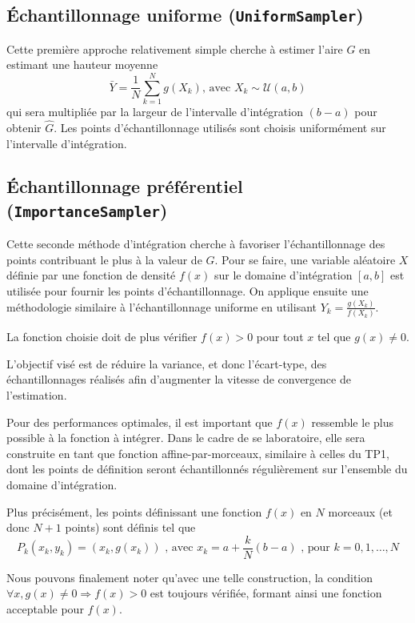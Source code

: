 \documentclass[a4paper,11pt]{article}
\begin{document}
\subsection{Échantillonnage uniforme {\normalfont({\tt UniformSampler})}}

Cette première approche relativement simple cherche à estimer l'aire $G$ en estimant une hauteur moyenne
\[
	\bar{Y} = \frac{1}{N} \sum_{k=1}^{N} g(X_k) \text{, avec } X_k \sim \mathcal{U}(a, b)
\]
qui sera multipliée par la largeur de l'intervalle d'intégration $(b-a)$ pour obtenir $\hat{G}$. Les points d'échantillonnage utilisés sont choisis uniformément sur l'intervalle d'intégration.

\subsection{Échantillonnage préférentiel {\normalfont({\tt ImportanceSampler})}}

Cette seconde méthode d'intégration cherche à favoriser l'échantillonnage des points contribuant le plus à la valeur de $G$. Pour se faire, une variable aléatoire $X$ définie par une fonction de densité $f(x)$ sur le domaine d'intégration $[a,b]$ est utilisée pour fournir les points d'échantillonnage. On applique ensuite une méthodologie similaire à l'échantillonnage uniforme en utilisant $Y_k=\frac{g(X_k)}{f(X_k)}$.

La fonction choisie doit de plus vérifier $f(x) > 0$ pour tout $x$ tel que $g(x) \ne 0$.

L'objectif visé est de réduire la variance, et donc l'écart-type, des échantillonnages réalisés afin d'augmenter la vitesse de convergence de l'estimation.

Pour des performances optimales, il est important que $f(x)$ ressemble le plus possible à la fonction à intégrer. Dans le cadre de se laboratoire, elle sera construite en tant que fonction affine-par-morceaux, similaire à celles du TP1, dont les points de définition seront échantillonnés régulièrement sur l'ensemble du domaine d'intégration.

Plus précisément, les points définissant une fonction $f(x)$ en $N$ morceaux (et donc $N+1$ points) sont définis tel que 
\[
	P_k(x_k, y_k) = ( x_k, g(x_k) )
	\text{ , avec } x_k = a + \frac{k}{N} (b - a)
	\text{ , pour } k = 0, 1, \dots, N
\]

Nous pouvons finalement noter qu'avec une telle construction, la condition 
$\forall x, g(x) \ne 0 \Rightarrow f(x) > 0$
est toujours vérifiée, formant ainsi une fonction acceptable pour $f(x)$.
\end{document}
